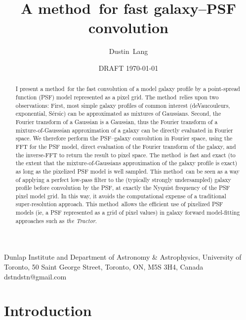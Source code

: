 \documentclass[11pt,preprint]{aastex}
\newcommand{\project}[1]{\textsl{#1}}
\newcommand{\trick}{method}
\newcommand{\sersic}{S\'ersic}
\begin{document}
\title{A \trick\ for fast galaxy--PSF convolution}
\author{Dustin~Lang}
%
{Dunlap Institute and Department of Astronomy \& Astrophysics,
  University of Toronto,
  50 Saint George Street, Toronto, ON, M5S 3H4, Canada}
%
{dstndstn@gmail.com}
\date{DRAFT \today}

\begin{abstract}
  I present a \trick\ for the fast convolution of a model galaxy
  profile by a point-spread function (PSF) model 
  represented as a pixel grid.
  The \trick\ relies upon two
  observations: First, most simple galaxy profiles of common interest
  (deVaucouleurs, exponential, \sersic) can be approximated as
  mixtures of Gaussians.  Second, the Fourier transform of a Gaussian
  is a Gaussian, thus the Fourier transform of a mixture-of-Gausssian
  approximation of a galaxy can be directly evaluated in Fourier
  space.
  We therefore perform the PSF--galaxy convolution in Fourier space,
  using the FFT for the PSF model, direct evaluation of the Fourier
  transform of the galaxy, and the inverse-FFT to return the result to
  pixel space.
  The \trick\ is fast and exact (to the extent that the mixture-of-Gaussians
  approximation of the galaxy profile is exact) as long as the pixelized PSF
  model is well sampled.
  This \trick\ can be seen as a way of applying a perfect low-pass filter to
  the (typically strongly undersampled) galaxy profile before convolution by
  the PSF, at exactly the Nyquist frequency of the PSF pixel model grid.  In
  this way, it avoids the computational expense of a traditional super-resolution
  approach.
  This \trick\ allows
  the efficient use of pixelized PSF models (ie, a PSF represented as
  a grid of pixel values) in galaxy forward model-fitting approaches such as
  \project{the Tractor}.
\end{abstract}

\section{Introduction}
\end{document}
